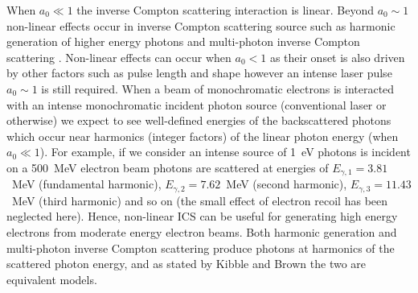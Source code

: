 \documentclass[../main.tex]{subfiles}
\begin{document}
When $a_{0} \ll 1$ the inverse Compton scattering interaction is linear. Beyond $a_{0}\sim 1$ non-linear effects occur in inverse Compton scattering source such as harmonic generation of higher energy photons \cite{sarachik1970classical,babzien2006observation} and multi-photon inverse Compton scattering \cite{bula1996observation}. Non-linear effects can occur when $a_{0}<1$ as their onset is also driven by other factors such as pulse length and shape \cite{terzic2019improving} however an intense laser pulse $a_{0}\sim 1$ is still required. When a beam of monochromatic electrons is interacted with an intense monochromatic incident photon source (conventional laser or otherwise) we expect to see well-defined energies of the backscattered photons which occur near harmonics (integer factors) of the linear photon energy (when $a_{0} \ll 1$). For example, if we consider an intense source of 1~\si{\electronvolt} photons is incident on a 500~\si{\mega\electronvolt} electron beam photons are scattered at energies of $E_{\gamma,1} = 3.81$~\si{\mega\electronvolt} (fundamental harmonic), $E_{\gamma,2} = 7.62$~\si{\mega\electronvolt} (second harmonic), $E_{\gamma,3} = 11.43$~\si{\mega\electronvolt} (third harmonic) and so on (the small effect of electron recoil has been neglected here). Hence, non-linear ICS can be useful for generating high energy electrons from moderate energy electron beams. Both harmonic generation and multi-photon inverse Compton scattering produce photons at harmonics of the scattered photon energy, and as stated by Kibble and Brown \cite{kibble1965frequency} the two are equivalent models.    
\end{document}
